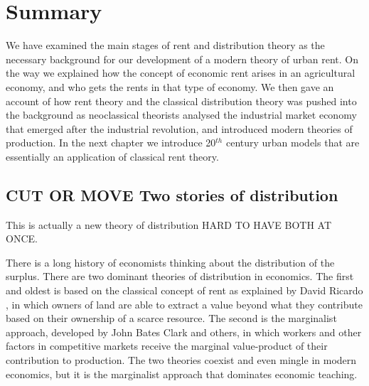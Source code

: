 \section{Summary}




We have examined the main stages of rent and distribution theory
as the necessary background for our development %
of a modern theory of urban rent. On the way we explained how the concept of economic rent arises in an agricultural economy, and who gets the rents in that type of economy. We then gave an account of how rent theory and the classical distribution theory was pushed into the background as neoclassical theorists analysed the industrial market economy that emerged after the industrial revolution, and introduced modern theories of production. In the next chapter we introduce 20$^{th}$ century urban models that are essentially an application of classical rent theory.

\subsection{CUT OR MOVE Two stories of distribution}
This is actually a new theory of distribution
HARD TO HAVE BOTH AT ONCE.

There is a long history of economists thinking about the distribution of the surplus. %
There are two dominant theories of \gls{distribution} in economics. The first and oldest is based on the classical concept of rent as explained  by David Ricardo \cite{ricardoEssayInfluenceLow1815}, in which owners of land are able to extract a value beyond what they contribute based on their ownership of a scarce resource. The second is the marginalist approach, developed by John Bates Clark and others, in which workers and other factors  in competitive markets receive the \gls{marginal value-product} of their contribution to production. The two theories coexist and even mingle in modern economics, but it is the marginalist approach that dominates economic teaching. 

